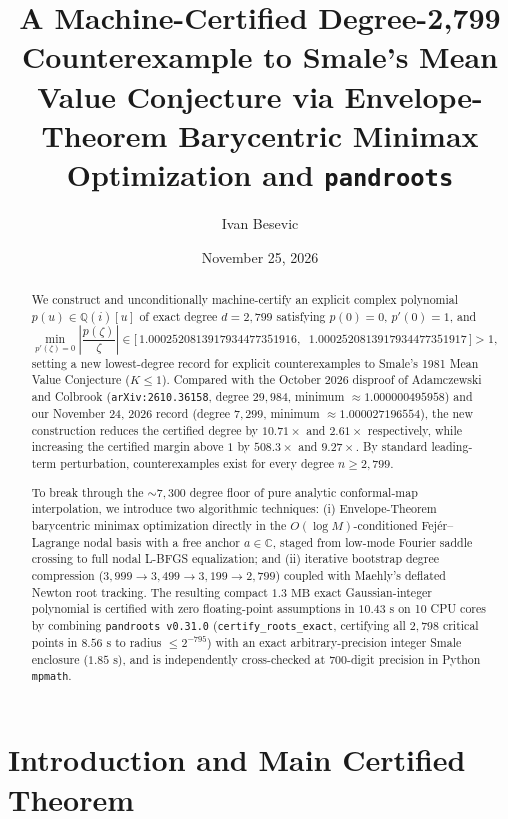 \documentclass[11pt,a4paper]{amsart}
\title[A Degree-2,799 Counterexample to Smale's Mean Value Conjecture]{%
A Machine-Certified Degree-2,799 Counterexample to Smale's Mean Value Conjecture
via Envelope-Theorem Barycentric Minimax Optimization and \texttt{pandroots}}
\author{Ivan Besevic}
\date{November 25, 2026}
\theoremstyle{remark}
\newcommand{\C}{\mathbb{C}}
\newcommand{\Q}{\mathbb{Q}}
\begin{document}
\begin{abstract}
We construct and unconditionally machine-certify an explicit complex polynomial
$p(u) \in \Q(i)[u]$ of exact degree $d = 2{,}799$ satisfying $p(0) = 0$,
$p'(0) = 1$, and
\[
  \min_{p'(\zeta) = 0} \left|\frac{p(\zeta)}{\zeta}\right|
  \in \bigl[\,1.0002520813917934477351916,\;\;
              1.0002520813917934477351917\,\bigr] > 1,
\]
setting a new lowest-degree record for explicit counterexamples to Smale's 1981
Mean Value Conjecture ($K \le 1$). Compared with the October 2026 disproof of
Adamczewski and Colbrook (\texttt{arXiv:2610.36158}, degree $29{,}984$, minimum
$\approx 1.000000495958$) and our November 24, 2026 record (degree $7{,}299$,
minimum $\approx 1.000027196554$), the new construction reduces the certified
degree by $10.71\times$ and $2.61\times$ respectively, while increasing the
certified margin above $1$ by $508.3\times$ and $9.27\times$. By standard
leading-term perturbation, counterexamples exist for every degree
$n \ge 2{,}799$.

To break through the $\sim 7{,}300$ degree floor of pure analytic conformal-map
interpolation, we introduce two algorithmic techniques: (i) Envelope-Theorem
barycentric minimax optimization directly in the $O(\log M)$-conditioned
Fej\'er--Lagrange nodal basis with a free anchor $a \in \C$, staged from low-mode
Fourier saddle crossing to full nodal L-BFGS equalization; and (ii) iterative
bootstrap degree compression ($3{,}999 \to 3{,}499 \to 3{,}199 \to 2{,}799$)
coupled with Maehly's deflated Newton root tracking. The resulting compact
$1.3\text{ MB}$ exact Gaussian-integer polynomial is certified with zero
floating-point assumptions in $10.43\text{ s}$ on 10 CPU cores by combining
\texttt{pandroots v0.31.0} (\texttt{certify\_roots\_exact}, certifying all
$2{,}798$ critical points in $8.56\text{ s}$ to radius $\le 2^{-795}$) with an
exact arbitrary-precision integer Smale enclosure ($1.85\text{ s}$), and is
independently cross-checked at $700$-digit precision in Python \texttt{mpmath}.
\end{abstract}

\maketitle

\section{Introduction and Main Certified Theorem}
\end{document}
